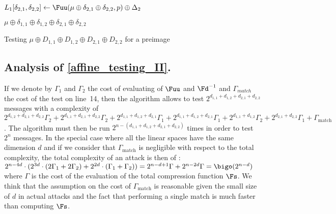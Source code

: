 \begin{algorithm}[ht]
        {
          $ L_{1}[\delta_{2,1}, \delta_{2,2}] \leftarrow
          \Fuu(\mu \oplus \delta_{2,1} \oplus \delta_{2,2}, 
          p  ) \oplus \Delta_2$ \;
        }

        { 
          {
            \Return $\mu  \oplus \delta_{1,1} \oplus \delta_{1,2} 
                        \oplus \delta_{2,1} \oplus \delta_{2,2}$ 
          }
        }
        \Return {$\bot$}
        \caption{\label{affine_testing_II} Testing $\mu \oplus D_{1,1} \oplus D_{1,2} \oplus D_{2,1} \oplus D_{2,2}$ for a preimage}

      \end{algorithm}

    \subsection{Analysis of \autoref{affine_testing_II}.}
      If we denote by $\Gamma_1$ and $\Gamma_2$ the cost of evaluating
      of $\Fuu$ and $\Fd^{-1}$ and $\Gamma_{match}$ the cost of the test on line~14,
      then the algorithm allows to test
      $2^{d_{1,1}+d_{1,2}+d_{2,1}+d_{2,2}}$ messages with a complexity of 
          $2^{d_{1,2}+d_{2,1}+d_{2,2}} \Gamma_2 + 2^{d_{1,1}+d_{2,1}+d_{2,2}} \Gamma_2 +
          2^{d_{1,1}+d_{1,2}+d_{2,1}} \Gamma_1 +2^{d_{1,1}+d_{1,2}+d_{2,1}} \Gamma_1 +
          2^{d_{1,1}+d_{1,2}} \Gamma_2 + 2^{d_{2,1}+d_{2,2}} \Gamma_1 + \Gamma_{\text{match}}$. 
      The algorithm must then be run $2^{n - (d_{1,1}+d_{1,2}+d_{2,1}+d_{2,2})}$ times in order to test
      $2^n$ messages. 
      In the special case where all the linear spaces have the same 
      dimension $d$ and if we consider that $\Gamma_{\text{match}}$ is negligible
      with respect to the total complexity, the total complexity of an attack is
      then of : 
      $2^{n-4d}\cdot(2^{3d}\cdot(2\Gamma_1+2\Gamma_2)+2^{2d}\cdot(\Gamma_1+\Gamma_2)) = 
      2^{n-d+1} \Gamma + 2^{n-2d} \Gamma = \bigo(2^{n-d})$ where $\Gamma$ is the cost of the 
      evaluation of the total compression function $\Fs$. We think that the assumption on
      the cost of $\Gamma_\text{match}$ is
      reasonable given the small size of $d$ in actual attacks and the fact that performing
      a single match is much faster than computing $\Fs$.

